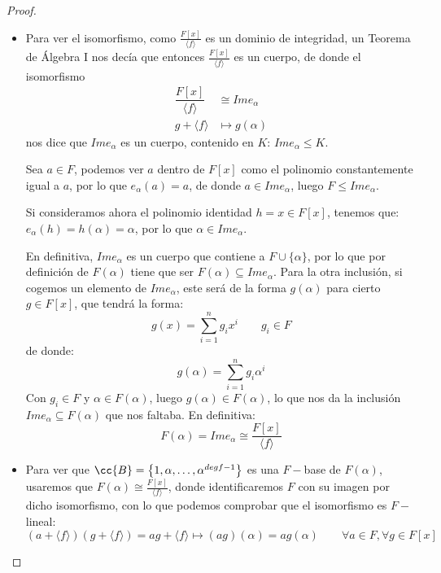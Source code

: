 \begin{prop}
\begin{proof}
\begin{itemize}
            \item Para ver el isomorfismo, como $\frac{F[x]}{\langle f \rangle }$ es un dominio de integridad, un Teorema de Álgebra I nos decía que entonces $\frac{F[x]}{\langle f \rangle }$ es un cuerpo, de donde el isomorfismo
                \begin{align*}
                    \dfrac{F[x]}{\langle f \rangle }&\cong Im e_\alpha  \\
                    g+\langle f \rangle  &\mapsto g(\alpha)
                \end{align*}
                nos dice que $Im e_\alpha$ es un cuerpo, contenido en $K$: $Im e_\alpha \leq K$.

                Sea $a\in F$, podemos ver $a$ dentro de $F[x]$ como el polinomio constantemente igual a $a$, por lo que $e_\alpha(a) = a$, de donde $a\in Im e_\alpha$, luego $F\leq Im e_\alpha$.

                Si consideramos ahora el polinomio identidad $h=x\in F[x]$, tenemos que: $e_\alpha(h) = h(\alpha) = \alpha$, por lo que $\alpha\in Im e_\alpha$.

                En definitiva, $Im e_\alpha$ es un cuerpo que contiene a $F\cup \{\alpha\}$, por lo que por definición de $F(\alpha)$ tiene que ser $F(\alpha) \subseteq Im e_\alpha$. Para la otra inclusión, si cogemos un elemento de $Im e_\alpha$, este será de la forma $g(\alpha)$ para cierto $g\in F[x]$, que tendrá la forma:
                \begin{equation*}
                    g(x) = \sum_{i=1}^{n} g_i x^i\qquad g_i \in F
                \end{equation*}
                de donde:
                \begin{equation*}
                    g(\alpha) = \sum_{i=1}^{n} g_i \alpha^i
                \end{equation*}
                Con $g_i \in F$ y $\alpha \in F(\alpha)$, luego $g(\alpha) \in F(\alpha)$, lo que nos da la inclusión $Im e_\alpha\subseteq F(\alpha)$ que nos faltaba. En definitiva:
                \begin{equation*}
                    F(\alpha) = Im e_\alpha \cong \dfrac{F[x]}{\langle f \rangle }
                \end{equation*}
            \item Para ver que $\cc{B}=\left\{1,\alpha,\ldots, \alpha^{degf-1}\right\}$ es una $F-$base de $F(\alpha)$, usaremos que $F(\alpha)\cong \frac{F[x]}{\langle f \rangle }$, donde identificaremos $F$ con su imagen por dicho isomorfismo, con lo que podemos comprobar que el isomorfismo es $F-$lineal:
                \begin{equation*}
                    (a+\langle f \rangle )(g+\langle f \rangle ) = ag+\langle f \rangle  \longmapsto (ag)(\alpha) = ag(\alpha) \qquad \forall a\in F, \forall g\in F[x]
                \end{equation*}


\end{itemize}
\end{proof}
\end{prop}
